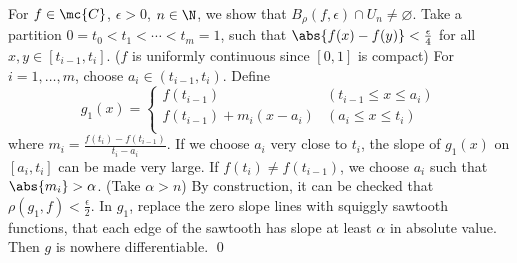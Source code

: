  For \(f \in \mc{C}\), \(\epsilon > 0\), \(n \in \N\), we show that \(B_\rho(f, \epsilon) \cap U_n \neq \varnothing\). Take a partition \(0 = t_0 < t_1 < \cdots < t_m = 1\), such that \(\abs{f(x) - f(y)} < \frac{\epsilon}{4}\) for all \(x, y \in [t_{i-1}, t_i]\). (\(f\) is uniformly continuous since \([0, 1]\) is compact) For \(i = 1, \dots, m\), choose \(a_i \in (t_{i-1}, t_i)\). Define
\[
    g_1(x) = \begin{cases}
        f(t_{i-1})              & (t_{i-1} \leq x \leq a_i) \\
        f(t_{i-1}) + m_i(x-a_i) & (a_i \leq x \leq t_i)     \\
    \end{cases}
\]
where \(m_i = \frac{f(t_i) - f(t_{i-1})}{t_i - a_i}\). If we choose \(a_i\) very close to \(t_i\), the slope of \(g_1(x)\) on \([a_i, t_i]\) can be made very large. If \(f(t_i) \neq f(t_{i-1})\), we choose \(a_i\) such that \(\abs{m_i} > \alpha\). (Take \(\alpha > n\)) By construction, it can be checked that \(\rho(g_1, f) < \frac{\epsilon}{2}\). In \(g_1\), replace the zero slope lines with squiggly sawtooth functions, that each edge of the sawtooth has slope at least \(\alpha\) in absolute value. Then \(g\) is nowhere differentiable. \qed

\pagebreak
